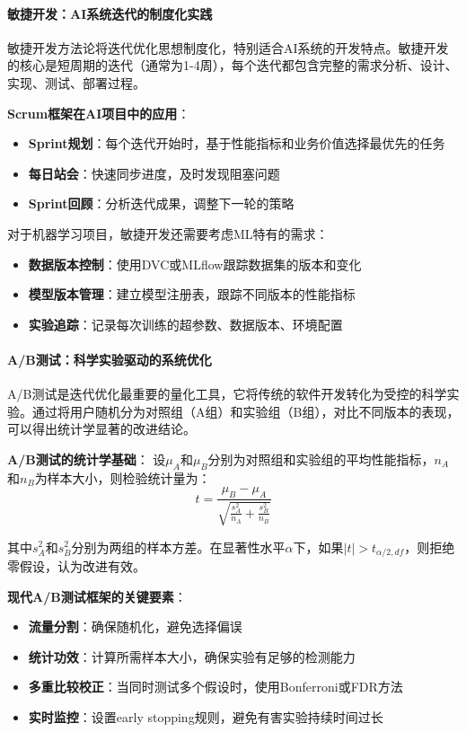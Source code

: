 \paragraph{敏捷开发：AI系统迭代的制度化实践}
敏捷开发方法论将迭代优化思想制度化，特别适合AI系统的开发特点。敏捷开发的核心是短周期的迭代（通常为1-4周），每个迭代都包含完整的需求分析、设计、实现、测试、部署过程。

\textbf{Scrum框架在AI项目中的应用}：
\begin{itemize}
\item \textbf{Sprint规划}：每个迭代开始时，基于性能指标和业务价值选择最优先的任务
\item \textbf{每日站会}：快速同步进度，及时发现阻塞问题
\item \textbf{Sprint回顾}：分析迭代成果，调整下一轮的策略
\end{itemize}

对于机器学习项目，敏捷开发还需要考虑ML特有的需求：
\begin{itemize}
\item \textbf{数据版本控制}：使用DVC或MLflow跟踪数据集的版本和变化
\item \textbf{模型版本管理}：建立模型注册表，跟踪不同版本的性能指标
\item \textbf{实验追踪}：记录每次训练的超参数、数据版本、环境配置
\end{itemize}

\paragraph{A/B测试：科学实验驱动的系统优化}
A/B测试是迭代优化最重要的量化工具，它将传统的软件开发转化为受控的科学实验。通过将用户随机分为对照组（A组）和实验组（B组），对比不同版本的表现，可以得出统计学显著的改进结论。

\textbf{A/B测试的统计学基础}：
设$\mu_A$和$\mu_B$分别为对照组和实验组的平均性能指标，$n_A$和$n_B$为样本大小，则检验统计量为：
$$t = \frac{\mu_B - \mu_A}{\sqrt{\frac{s_A^2}{n_A} + \frac{s_B^2}{n_B}}}$$

其中$s_A^2$和$s_B^2$分别为两组的样本方差。在显著性水平$\alpha$下，如果$|t| > t_{\alpha/2, df}$，则拒绝零假设，认为改进有效。

\textbf{现代A/B测试框架的关键要素}：
\begin{itemize}
\item \textbf{流量分割}：确保随机化，避免选择偏误
\item \textbf{统计功效}：计算所需样本大小，确保实验有足够的检测能力
\item \textbf{多重比较校正}：当同时测试多个假设时，使用Bonferroni或FDR方法
\item \textbf{实时监控}：设置early stopping规则，避免有害实验持续时间过长
\end{itemize}

